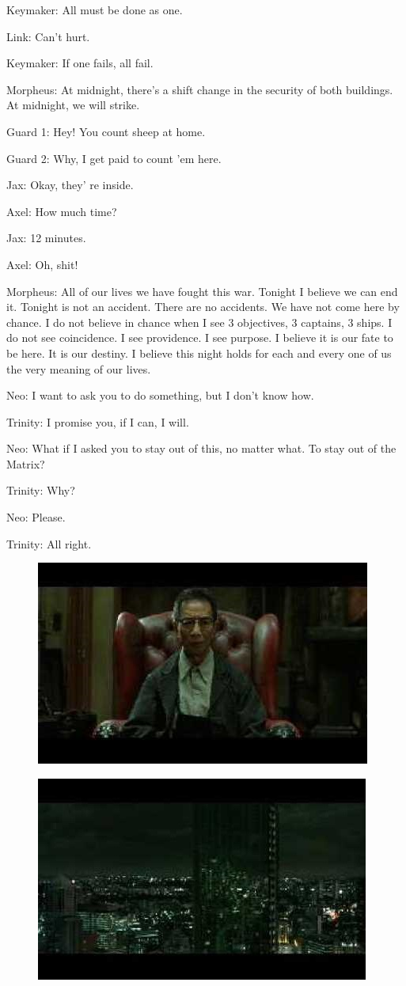 \documentclass[UTF8]{ctexart}
\newenvironment{myquote}{\color{green} \setlength{\leftskip}{6em} \setlength{\rightskip}{4em} \setlength{\parindent}{-2em}}{\par}
\begin{document}
\begin{myquote}
Keymaker: All must be done as one.

Link: Can't hurt.

Keymaker: If one fails, all fail.

Morpheus: At midnight, there's a shift change in the security of both buildings. At midnight, we will strike.

Guard 1: Hey! You count sheep at home.

Guard 2: Why, I get paid to count 'em here.

Jax: Okay, they' re inside.

Axel: How much time?

Jax: 12 minutes.

Axel: Oh, shit!

Morpheus: All of our lives we have fought this war. Tonight I believe we can end it. Tonight is not an accident. There are no accidents. We have not come here by chance. I do not believe in chance when I see 3 objectives, 3 captains, 3 ships. I do not see coincidence. I see providence. I see purpose. I believe it is our fate to be here. It is our destiny. I believe this night holds for each and every one of us the very meaning of our lives.

Neo: I want to ask you to do something, but I don't know how.

Trinity: I promise you, if I can, I will.

Neo: What if I asked you to stay out of this, no matter what. To stay out of the Matrix?

Trinity: Why?

Neo: Please.

Trinity: All right.
\end{myquote}

\begin{figure}[htb]
\centering
\includegraphics[width=0.5\linewidth]{fig/read_reloaded-144}
\end{figure}

\begin{figure}[htb]
\centering
\includegraphics[width=0.5\linewidth]{fig/read_reloaded-144-1}
\end{figure}
\end{document}
